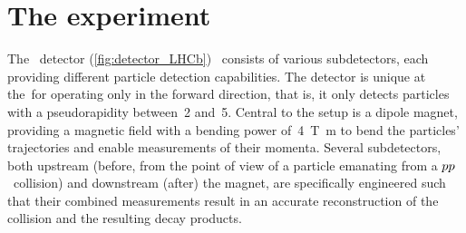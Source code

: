 \clearpage
\section{The \lhcb experiment}
\label{sec:LHCb}

The \lhcb~detector (\cref{fig:detector_LHCb})~\cite{1748-0221-3-08-S08005,LHCb-DP-2014-002} consists of various subdetectors, each providing different particle detection capabilities.
The detector is unique at the~\lhc for operating only in the forward direction, that is, it only detects particles with a pseudorapidity between~\num{2} and~\num{5}.
Central to the setup is a dipole magnet, providing a magnetic field with a bending power of~\SI[inter-unit-product=]{4}{\tesla\metre} to bend the particles' trajectories and enable measurements of their momenta.
Several subdetectors, both upstream (before, from the point of view of a particle emanating from a \({{p}{p}}\)~collision) and downstream (after) the magnet, are specifically engineered such that their combined measurements result in an accurate reconstruction of the collision and the resulting decay products.
%
